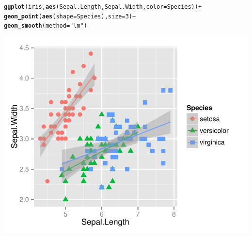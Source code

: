 \documentclass{beamer}\usepackage[]{graphicx}\usepackage[]{color}
\makeatletter
\newcommand{\hlnum}[1]{\textcolor[rgb]{0.686,0.059,0.569}{#1}}%
\newcommand{\hlstr}[1]{\textcolor[rgb]{0.192,0.494,0.8}{#1}}%
\newcommand{\hlopt}[1]{\textcolor[rgb]{0,0,0}{#1}}%
\newcommand{\hlstd}[1]{\textcolor[rgb]{0.345,0.345,0.345}{#1}}%
\newcommand{\hlkwc}[1]{\textcolor[rgb]{0.333,0.667,0.333}{#1}}%
\newcommand{\hlkwd}[1]{\textcolor[rgb]{0.737,0.353,0.396}{\textbf{#1}}}%
\newenvironment{kframe}{%
 \def\at@end@of@kframe{}%
 \ifinner\ifhmode%
  \def\at@end@of@kframe{\end{minipage}}%
  \begin{minipage}{\columnwidth}%
 \fi\fi%
 \def\FrameCommand##1{\hskip\@totalleftmargin \hskip-\fboxsep
 \colorbox{shadecolor}{##1}\hskip-\fboxsep
     \hskip-\linewidth \hskip-\@totalleftmargin \hskip\columnwidth}%
 \MakeFramed {\advance\hsize-\width
   \@totalleftmargin\z@ \linewidth\hsize
   \@setminipage}}%
 {\par\unskip\endMakeFramed%
 \at@end@of@kframe}
\newenvironment{knitrout}{}{} %
\makeatother
\begin{document}
\begin{frame}[fragile]
\begin{knitrout}\footnotesize
{}\color{fgcolor}\begin{kframe}
\begin{alltt}
\hlkwd{ggplot}\hlstd{(iris,} \hlkwd{aes}\hlstd{(Sepal.Length, Sepal.Width,} \hlkwc{color} \hlstd{= Species))} \hlopt{+}
\hlkwd{geom_point}\hlstd{(}\hlkwd{aes}\hlstd{(}\hlkwc{shape} \hlstd{= Species),} \hlkwc{size} \hlstd{=} \hlnum{3}\hlstd{)} \hlopt{+}
\hlkwd{geom_smooth}\hlstd{(}\hlkwc{method} \hlstd{=} \hlstr{"lm"}\hlstd{)}
\end{alltt}
\end{kframe}

{\centering \includegraphics[width=.75\linewidth]{figure/adding_stats_} 

}



\end{knitrout}

\end{frame}

\end{document}
